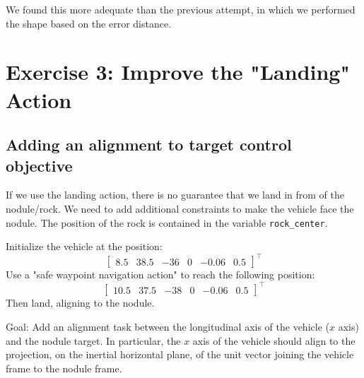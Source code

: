 \documentclass{article}
\begin{document}
We found this more adequate than the previous attempt, in which we performed the shape based on the error distance.
\clearpage

\section{Exercise 3: Improve the "Landing" Action}
\subsection{Adding an alignment to target control objective}
If we use the landing action, there is no guarantee that we land in from of the nodule/rock. We need to add additional constraints to make the vehicle face the nodule. The position of the rock is contained in the variable \texttt{rock\_center}. 

Initialize the vehicle at the position:
\begin{displaymath}
\begin{bmatrix} 8.5 & 38.5 & -36 & 0 & -0.06 & 0.5 \end{bmatrix}^\top
\end{displaymath} 
Use a "safe waypoint navigation action" to reach the following position: 
\begin{displaymath}
\begin{bmatrix} 10.5 & 37.5 & -38 & 0 & -0.06 & 0.5 \end{bmatrix}^\top
\end{displaymath} 
Then land, aligning to the nodule.

Goal: Add an alignment task between the longitudinal axis of the vehicle ($x$ axis) and the nodule target. In particular, the $x$ axis of the vehicle should align to the projection, on the inertial horizontal plane, of the unit vector joining the vehicle frame to the nodule frame.
\end{document}
